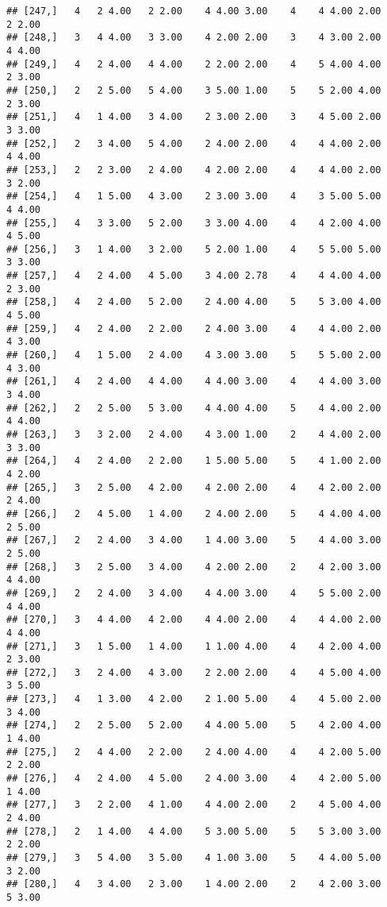 \documentclass[]{article}
\begin{document}
\begin{verbatim}
## [247,]   4   2 4.00   2 2.00    4 4.00 3.00    4    4 4.00 2.00    2 2.00
## [248,]   3   4 4.00   3 3.00    4 2.00 2.00    3    4 3.00 2.00    4 4.00
## [249,]   4   2 4.00   4 4.00    2 2.00 2.00    4    5 4.00 4.00    2 3.00
## [250,]   2   2 5.00   5 4.00    3 5.00 1.00    5    5 2.00 4.00    2 3.00
## [251,]   4   1 4.00   3 4.00    2 3.00 2.00    3    4 5.00 2.00    3 3.00
## [252,]   2   3 4.00   5 4.00    2 4.00 2.00    4    4 4.00 2.00    4 4.00
## [253,]   2   2 3.00   2 4.00    4 2.00 2.00    4    4 4.00 2.00    3 2.00
## [254,]   4   1 5.00   4 3.00    2 3.00 3.00    4    3 5.00 5.00    4 4.00
## [255,]   4   3 3.00   5 2.00    3 3.00 4.00    4    4 2.00 4.00    4 5.00
## [256,]   3   1 4.00   3 2.00    5 2.00 1.00    4    5 5.00 5.00    3 3.00
## [257,]   4   2 4.00   4 5.00    3 4.00 2.78    4    4 4.00 4.00    2 3.00
## [258,]   4   2 4.00   5 2.00    2 4.00 4.00    5    5 3.00 4.00    4 5.00
## [259,]   4   2 4.00   2 2.00    2 4.00 3.00    4    4 4.00 2.00    4 3.00
## [260,]   4   1 5.00   2 4.00    4 3.00 3.00    5    5 5.00 2.00    4 3.00
## [261,]   4   2 4.00   4 4.00    4 4.00 3.00    4    4 4.00 3.00    3 4.00
## [262,]   2   2 5.00   5 3.00    4 4.00 4.00    5    4 4.00 2.00    4 4.00
## [263,]   3   3 2.00   2 4.00    4 3.00 1.00    2    4 4.00 2.00    3 3.00
## [264,]   4   2 4.00   2 2.00    1 5.00 5.00    5    4 1.00 2.00    4 2.00
## [265,]   3   2 5.00   4 2.00    4 2.00 2.00    4    4 2.00 2.00    2 4.00
## [266,]   2   4 5.00   1 4.00    2 4.00 2.00    5    4 4.00 4.00    2 5.00
## [267,]   2   2 4.00   3 4.00    1 4.00 3.00    5    4 4.00 3.00    2 5.00
## [268,]   3   2 5.00   3 4.00    4 2.00 2.00    2    4 2.00 3.00    4 4.00
## [269,]   2   2 4.00   3 4.00    4 4.00 3.00    4    5 5.00 2.00    4 4.00
## [270,]   3   4 4.00   4 2.00    4 4.00 2.00    4    4 4.00 2.00    4 4.00
## [271,]   3   1 5.00   1 4.00    1 1.00 4.00    4    4 2.00 4.00    2 3.00
## [272,]   3   2 4.00   4 3.00    2 2.00 2.00    4    4 5.00 4.00    3 5.00
## [273,]   4   1 3.00   4 2.00    2 1.00 5.00    4    4 5.00 2.00    3 4.00
## [274,]   2   2 5.00   5 2.00    4 4.00 5.00    5    4 2.00 4.00    1 4.00
## [275,]   2   4 4.00   2 2.00    2 4.00 4.00    4    4 2.00 5.00    2 2.00
## [276,]   4   2 4.00   4 5.00    2 4.00 3.00    4    4 2.00 5.00    1 4.00
## [277,]   3   2 2.00   4 1.00    4 4.00 2.00    2    4 5.00 4.00    2 4.00
## [278,]   2   1 4.00   4 4.00    5 3.00 5.00    5    5 3.00 3.00    2 2.00
## [279,]   3   5 4.00   3 5.00    4 1.00 3.00    5    4 4.00 5.00    3 2.00
## [280,]   4   3 4.00   2 3.00    1 4.00 2.00    2    4 2.00 3.00    5 3.00

\end{verbatim}
\end{document}
